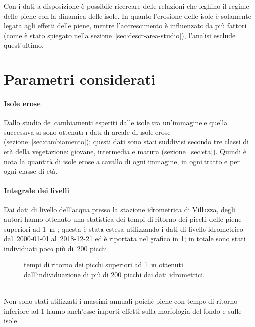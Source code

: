 Con i dati a disposizione è possibile ricercare delle relazioni che leghino il regime delle piene con la dinamica delle isole.
In quanto l'erosione delle isole è solamente legata agli effetti delle piene, mentre l'accrescimento è influenzato da più fattori (come è stato spiegato nella sezione~\ref{sec:descr-area-studio}), l'analisi esclude quest'ultimo.

\section{Parametri considerati}

\paragraph{Isole erose}
Dallo studio dei cambiamenti esperiti dalle isole tra un'immagine e quella successiva si sono ottenuti i dati di areale di isole erose (sezione~\ref{sec:cambiamento});
questi dati sono stati suddivisi secondo tre classi di età della vegetazione: giovane, intermedia e matura (sezione~\ref{sec:eta}).
Quindi è nota la quantità di isole erose a cavallo di ogni immagine, in ogni tratto e per ogni classe di età.

\paragraph{Integrale dei livelli}
Dai dati di livello dell'acqua presso la stazione idrometrica di Villuzza, degli autori hanno ottenuto una statistica dei tempi di ritorno dei picchi delle piene superiori ad \SI{1}{\m} ; questa è stata estesa utilizzando i dati di livello idrometrico dal~2000-01-01 al~2018-12-21 ed è riportata nel grafico in \cref{graph:tr-picchi}; in totale sono stati individuati poco più di~200 picchi.
%
\begin{figure}
	\centering
	
	\caption[tempi di ritorno dei picchi superiori ad \SI{1}{\m}]{tempi di ritorno dei picchi superiori ad \SI{1}{\m} ottenuti dall'individuazione di più di 200 picchi dai dati idrometrici.}
	\label{graph:tr-picchi}
\end{figure}
%
\\
Non sono stati utilizzati i massimi annuali poiché piene con tempo di ritorno inferiore ad \SI{1}{\anno} hanno anch'esse importi effetti sulla morfologia del fondo e sulle isole.

